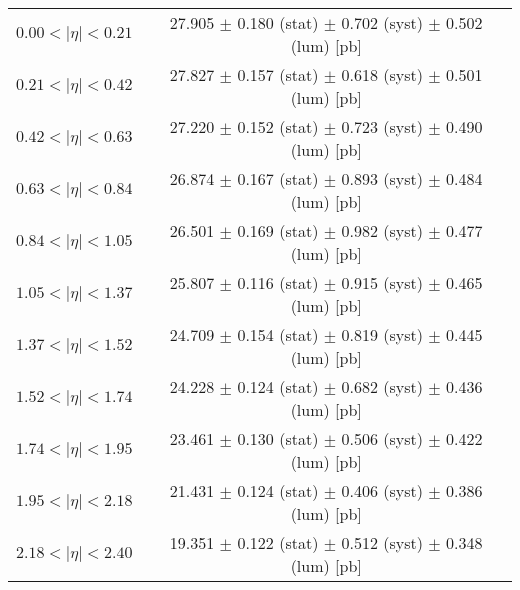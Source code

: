 \begin{tabular}{lc}
\hline
$0.00 < |\eta| <0.21$          & 27.905 $\pm$ 0.180 (stat) $\pm$ 0.702 (syst) $\pm$ 0.502 (lum) [pb]  \\
$0.21 < |\eta| <0.42$          & 27.827 $\pm$ 0.157 (stat) $\pm$ 0.618 (syst) $\pm$ 0.501 (lum) [pb]  \\
$0.42 < |\eta| <0.63$          & 27.220 $\pm$ 0.152 (stat) $\pm$ 0.723 (syst) $\pm$ 0.490 (lum) [pb]  \\
$0.63 < |\eta| <0.84$          & 26.874 $\pm$ 0.167 (stat) $\pm$ 0.893 (syst) $\pm$ 0.484 (lum) [pb]  \\
$0.84 < |\eta| <1.05$          & 26.501 $\pm$ 0.169 (stat) $\pm$ 0.982 (syst) $\pm$ 0.477 (lum) [pb]  \\
$1.05 < |\eta| <1.37$          & 25.807 $\pm$ 0.116 (stat) $\pm$ 0.915 (syst) $\pm$ 0.465 (lum) [pb]  \\
$1.37 < |\eta| <1.52$          & 24.709 $\pm$ 0.154 (stat) $\pm$ 0.819 (syst) $\pm$ 0.445 (lum) [pb]  \\
$1.52 < |\eta| <1.74$          & 24.228 $\pm$ 0.124 (stat) $\pm$ 0.682 (syst) $\pm$ 0.436 (lum) [pb]  \\
$1.74 < |\eta| <1.95$          & 23.461 $\pm$ 0.130 (stat) $\pm$ 0.506 (syst) $\pm$ 0.422 (lum) [pb]  \\
$1.95 < |\eta| <2.18$          & 21.431 $\pm$ 0.124 (stat) $\pm$ 0.406 (syst) $\pm$ 0.386 (lum) [pb]  \\
$2.18 < |\eta| <2.40$          & 19.351 $\pm$ 0.122 (stat) $\pm$ 0.512 (syst) $\pm$ 0.348 (lum) [pb]  \\
\hline
\end{tabular}
